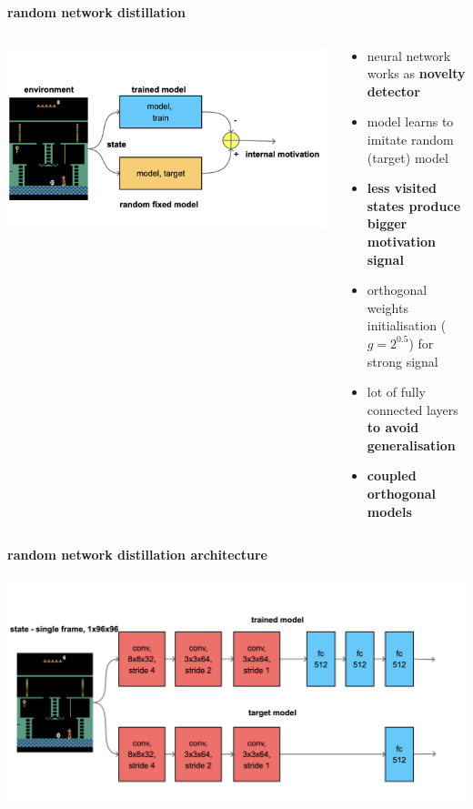 \documentclass{beamer}
\begin{document}
  
  
  \begin{frame}{\bf random network distillation}
  
    \begin{columns}
  
      \begin{column}{0.5\textwidth}
        \includegraphics[scale=0.1]{../diagrams/rnd/rnd.png}
      \end{column}
  
      \begin{column}{0.5\textwidth}
        \begin{itemize}
          \item neural network works as {\bf novelty detector}
          \item model learns to imitate random (target) model
          \item {\bf less visited states produce bigger motivation signal}
          \item orthogonal weights initialisation ($g=2^{0.5}$) for strong signal
          \item lot of fully connected layers {\bf to avoid generalisation}
          \item {\bf coupled orthogonal models}
        \end{itemize}
      \end{column}
  
  
    \end{columns}
  
  \end{frame}
  
  
  \begin{frame}{\bf random network distillation architecture}
  
  \centering
  \includegraphics[scale=0.12]{../diagrams/rnd/modelrnd.png}
  
  \end{frame}
\end{document}
